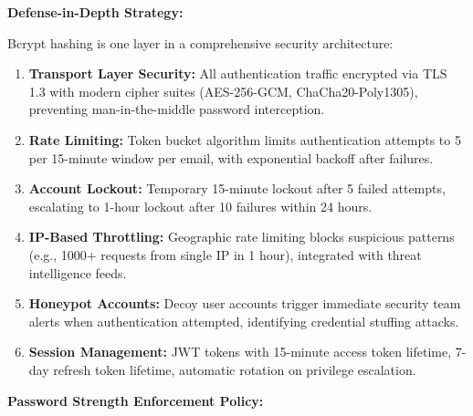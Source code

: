 \documentclass[12pt,a4paper]{article}
\begin{document}
\textbf{Defense-in-Depth Strategy:}

Bcrypt hashing is one layer in a comprehensive security architecture:

\begin{enumerate}[leftmargin=2em, itemsep=6pt]
    \item \textbf{Transport Layer Security:} All authentication traffic encrypted via TLS 1.3 with modern cipher suites (AES-256-GCM, ChaCha20-Poly1305), preventing man-in-the-middle password interception.
    \item \textbf{Rate Limiting:} Token bucket algorithm limits authentication attempts to 5 per 15-minute window per email, with exponential backoff after failures.
    \item \textbf{Account Lockout:} Temporary 15-minute lockout after 5 failed attempts, escalating to 1-hour lockout after 10 failures within 24 hours.
    \item \textbf{IP-Based Throttling:} Geographic rate limiting blocks suspicious patterns (e.g., 1000+ requests from single IP in 1 hour), integrated with threat intelligence feeds.
    \item \textbf{Honeypot Accounts:} Decoy user accounts trigger immediate security team alerts when authentication attempted, identifying credential stuffing attacks.
    \item \textbf{Session Management:} JWT tokens with 15-minute access token lifetime, 7-day refresh token lifetime, automatic rotation on privilege escalation.
\end{enumerate}

\vspace{0.5em}

\textbf{Password Strength Enforcement Policy:}
\end{document}
